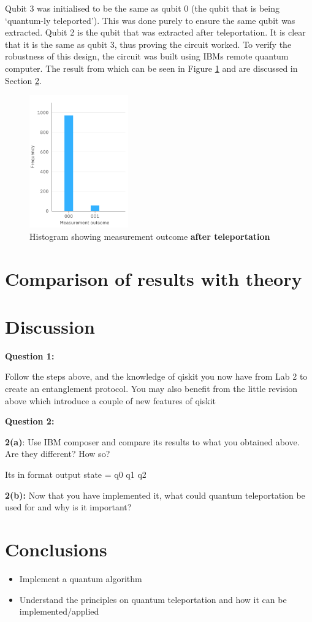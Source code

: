 Qubit 3 was initialised to be the same as qubit 0 (the qubit that is being `quantum-ly teleported'). This was done purely to ensure the same qubit was extracted. Qubit 2 is the qubit that was extracted after teleportation. It is clear that it is the same as qubit 3, thus proving the circuit worked. To verify the robustness of this design, the circuit was built using IBMs remote quantum computer. The result from which can be seen in Figure \ref{fig:ibmTeleport} and are discussed in Section \ref{sec:discussTeleport}.
\begin{figure}[h]
    \centering
    \includegraphics[width=0.38\textwidth]{lab3/images/ibmTeleport.png}
    \caption{Histogram showing measurement outcome \textbf{after teleportation}}
    \label{fig:ibmTeleport}
\end{figure}

\section{Comparison of results with theory}
\section{Discussion} \label{sec:discussTeleport}
\textbf{Question 1:}

Follow the steps above, and the knowledge of qiskit you now have from Lab 2 to create an entanglement protocol. You may also benefit from the little revision above which introduce a couple of new features of qiskit

\textbf{Question 2:}

\textbf{2(a)}: Use IBM composer and compare its results to what you obtained above. Are they different? How so?

Its in format output state = q0 q1 q2

\textbf{2(b):} Now that you have implemented it, what could quantum teleportation be used for and why is it important?

\section{Conclusions}

\begin{itemize}
    \item Implement a quantum algorithm
    \item Understand the principles on quantum teleportation and how it can be implemented/applied
\end{itemize}